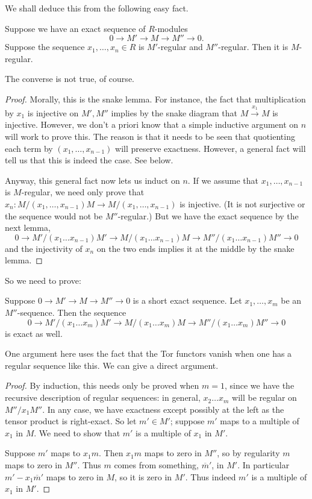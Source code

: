 We shall deduce this from the following easy fact.
\begin{lemma} 
Suppose we have an exact sequence of $R$-modules
\[  0 \to M' \to M \to M'' \to 0.  \]
Suppose the sequence $x_1, \dots, x_n \in R$ is $M'$-regular and $M''$-regular.
Then it is $M$-regular.
\end{lemma} 
The converse is not true, of course.
\begin{proof} 
Morally, this is the snake lemma. For instance, the fact that multiplication by
$x_1$ is injective on $M', M''$ implies by the snake diagram that $M
\stackrel{x_1}{\to} M$ is injective. However, we don't a priori know that a
simple inductive argument on $n$ will work to prove this. The reason is that it needs
to be seen that quotienting each term by $(x_1, \dots, x_{n-1})$ will preserve
exactness. However, a general fact will tell us that this is indeed the case.
See below.

Anyway, this general fact now lets us induct on $n$. If we assume
that $x_1, \dots, x_{n-1}$ is $M$-regular, we need only prove that $x_{n}:
M/(x_1, \dots, x_{n-1})M
\to M/(x_1, \dots, x_{n-1})$ is injective. (It is not surjective or the
sequence would not be $M''$-regular.) But we have the exact sequence by the
next lemma,
\[ 0 \to M'/(x_1 \dots x_{n-1})M' \to M/(x_1 \dots x_{n-1})M \to  M''/(x_1
\dots x_{n-1})M'' \to 0 \]
and the injectivity of $x_n$ on the two ends implies it at the middle by the
snake lemma.
\end{proof} 

So we need to prove:
\begin{lemma} 
Suppose $0 \to M' \to M \to M'' \to 0$ is a short exact sequence. Let $x_1,
\dots, x_m$ be an $M''$-sequence. Then the sequence
\[ 0 \to M'/(x_1 \dots x_m)M' \to M/(x_1 \dots x_m)M \to   M''/(x_1 \dots
x_m)M'' \to 0\]
is exact as well.
\end{lemma} 
One argument here uses the fact that the Tor functors vanish when one has a
regular sequence like this. We can give a direct argument. 
\begin{proof} 
By induction, this needs only be proved when $m=1$, since we have the recursive
description of regular sequences: in general, $x_2 \dots x_m$ will be regular
on $M''/x_1 M''$. 
In any case, we have exactness except possibly at the left as the tensor
product is right-exact. So let $m' \in M'$; suppose $m'$ maps to a multiple of
$x_1$ in $M$. We need to show that $m'$ is a multiple of $x_1$ in $M'$. 

Suppose $m'$ maps to $x_1 m$. Then $x_1m$ maps to zero in $M''$, so by regularity $m$
maps to zero in $M''$. Thus $m$ comes from something, $\overline{m}'$, in $M'$. In particular
$m' - x_1 \overline{m}'$ maps to zero in $M$, so it is zero in $M'$. Thus
indeed $m'$ is a multiple of $x_1$ in $M'$.
\end{proof} 

